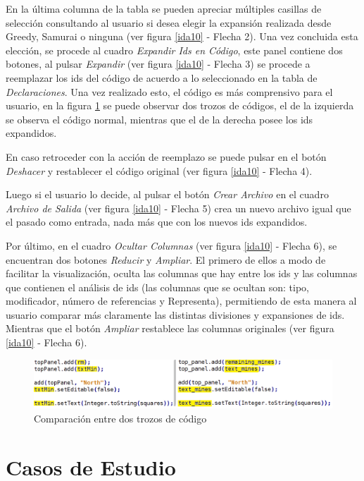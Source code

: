 \documentclass[a4paper,12pt]{report}
\begin{document}
En la última columna de la tabla se pueden apreciar múltiples casillas de selección consultando al usuario si desea elegir la expansión realizada desde Greedy, Samurai o ninguna (ver figura \ref{ida10} - Flecha 2). Una vez concluida esta elección, se procede al cuadro \textit{Expandir Ids en Código}, este panel contiene dos botones, al pulsar \textit{Expandir} (ver figura \ref{ida10} - Flecha 3) se procede a reemplazar los ids del código de acuerdo a lo seleccionado en la tabla de \textit{Declaraciones}.
Una vez realizado esto, el código es más comprensivo para el usuario, en la figura \ref{ida11} se puede observar dos trozos de códigos, el de la izquierda se observa el código normal, mientras que el de la derecha posee los ids expandidos.

En caso retroceder con la acción de reemplazo se puede pulsar en el botón \textit{Deshacer} y restablecer el código original (ver figura \ref{ida10} - Flecha 4).

Luego si el usuario lo decide, al pulsar el botón \textit{Crear Archivo} en el cuadro \textit{Archivo de Salida} (ver figura \ref{ida10} - Flecha 5) crea un nuevo archivo igual que el pasado como entrada, nada más que con los nuevos ids expandidos.

Por último, en el cuadro \textit{Ocultar Columnas} (ver figura \ref{ida10} - Flecha 6), se encuentran dos botones \textit{Reducir} y \textit{Ampliar}. El primero de ellos a modo de facilitar la visualización, oculta las columnas que hay entre los ids y las columnas que contienen el análisis de ids (las columnas que se ocultan son: tipo, modificador, número de referencias y Representa), permitiendo de esta manera al usuario comparar más claramente las distintas divisiones y expansiones de ids. Mientras que el botón \textit{Ampliar} restablece las columnas originales (ver figura \ref{ida10} - Flecha 6).

\begin{figure}[t] %
\centerline{%
\includegraphics[scale= 0.45]{./ida_11.png}
}
\caption{Comparación entre dos trozos de código}
\label{ida11}
\end{figure}

\section{Casos de Estudio}
\end{document}
